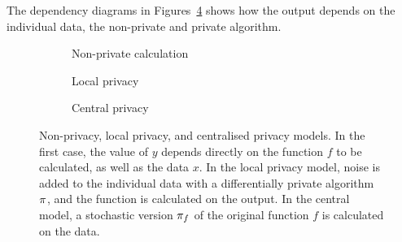 \begin{frame}
{    The dependency diagrams in Figures~\ref{fig:privacy-diagrams} shows
    how the output depends on the individual data, the non-private and
    private algorithm. 

  }
  
  \begin{figure}[H]
    \begin{subfigure}{0.3\textwidth}
      \centering
      \caption{Non-private calculation}
      \label{fig:non-private}
    \end{subfigure}
    \begin{subfigure}{0.3\textwidth}
      \centering
      \caption{Local privacy}
      \label{fig:local-privacy}
    \end{subfigure}
    \begin{subfigure}{0.3\textwidth}
      \centering
      \caption{Central privacy}
      \label{fig:central-privacy}
    \end{subfigure}
    \caption{Non-privacy, local privacy, and centralised privacy models. In the first case, the value of $y$ depends directly on the function $f$ to be calculated, as well as the data $x$. In the local privacy model, noise is added to the individual data with a differentially private algorithm $\pi$, and the function is calculated on the output. In the central model, a stochastic version $\pi_f$ of the original function $f$ is calculated on the data.}
    \label{fig:privacy-diagrams}
  \end{figure}



\end{frame}
